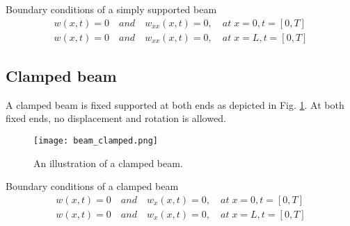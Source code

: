 Boundary conditions of a simply supported beam
\begin{equation}
    \label{eq:simply_supported_bc}
    \begin{array}{l}
    w(x,t)=0 \quad and \quad w_{xx}(x,t)=0, \quad at \; x=0, t=[0,T] \\
    w(x,t)=0 \quad and \quad w_{xx}(x,t)=0, \quad at \; x=L, t=[0,T]
    \end{array}
\end{equation}

\subsection{Clamped beam}
A clamped beam is fixed supported at both ends as depicted in Fig. \ref{fig:beam_clamped}. At both fixed ends,
no displacement and rotation is allowed. 

\begin{figure}[!ht]
    \centering
    \texttt{[image: beam\_clamped.png]}  
    \caption{An illustration of a clamped beam.}
    \label{fig:beam_clamped}
\end{figure}

Boundary conditions of a clamped beam
\begin{equation}
    \begin{array}{l}
    w(x,t)=0 \quad and \quad w_{x}(x,t)=0, \quad at \; x=0, t=[0,T] \\
    w(x,t)=0 \quad and \quad w_{x}(x,t)=0, \quad at \; x=L, t=[0,T]
    \end{array}
\end{equation}
